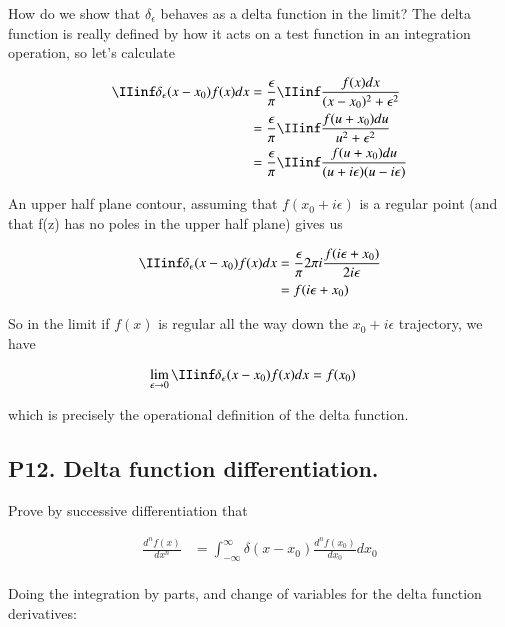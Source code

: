\documentclass{article}
\begin{document}
How do we show that $\delta_\epsilon$ behaves as a delta function in the limit?  The delta function is really defined by how it
acts on a test function in an integration operation, so let's calculate 

\begin{align*}
\IIinf \delta_\epsilon(x - x_0) f(x) dx 
&=
\frac{\epsilon }{\pi} \IIinf \frac{f(x) dx}{(x-x_0)^2 + \epsilon^2} \\
&=
\frac{\epsilon }{\pi} \IIinf \frac{f(u + x_0) du}{u^2 + \epsilon^2} \\
&=
\frac{\epsilon }{\pi} \IIinf \frac{f(u + x_0) du}{(u + i \epsilon)(u - i \epsilon)} \\
\end{align*}

An upper half plane contour, assuming that $f(x_0 + i\epsilon)$ is a regular point (and that f(z) has no poles in the upper half plane) gives us

\begin{align*}
\IIinf \delta_\epsilon(x - x_0) f(x) dx 
&=
\frac{\epsilon }{\pi} 2 \pi i \frac{f(i \epsilon + x_0) }{2 i \epsilon} \\
&=
f(i \epsilon + x_0)
\end{align*}

So in the limit if $f(x)$ is regular all the way down the $x_0 + i\epsilon$ trajectory, we have

\begin{align*}
\lim_{\epsilon \rightarrow 0} \IIinf \delta_\epsilon(x - x_0) f(x) dx &= f(x_0)
\end{align*}

which is precisely the operational definition of the delta function.

\subsection{P12. Delta function differentiation. }

Prove by successive differentiation that

\begin{align*}
\frac{d^n f(x)}{dx^n} 
&= \int_{-\infty}^{\infty} \delta(x - x_0) \frac{d^n f(x_0)}{dx_0} dx_0 \\
\end{align*}

Doing the integration by parts, and change of variables for the delta function derivatives:
\end{document}
